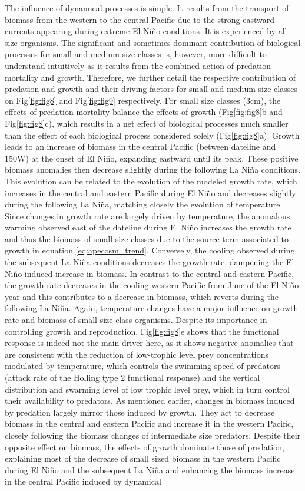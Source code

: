 The influence of dynamical processes is simple. It results from the transport of biomass from the western to the central Pacific due to the strong eastward currents appearing during extreme El Niño conditions. It is experienced by all size organisms. The significant and sometimes dominant contribution of biological processes for small and medium size classes is, however, more difficult to understand intuitively as it results from the combined action of predation mortality and growth. Therefore, we further detail the respective contribution of predation and growth and their driving factors for small and medium size classes on Fig\ref{fig:fig8} and Fig\ref{fig:fig9} respectively. For small size classes (3cm), the effects of predation mortality balance the effects of growth (Fig\ref{fig:fig8}b and Fig\ref{fig:fig8}c), which results in a net effect of biological processes much smaller than the effect of each biological process considered solely (Fig\ref{fig:fig8}a). Growth leads to an increase  of biomass in the central Pacific (between dateline and 150\degree{}W) at the onset of El Niño, expanding eastward until its peak. These positive biomass anomalies then decrease slightly during the following La Niña conditions. This evolution can be related to the evolution of the modeled growth rate, which increases in the central and eastern Pacific during El Niño and decreases slightly during the following La Niña, matching closely the evolution of temperature. Since changes in growth rate are largely driven by temperature, the anomalous warming observed east of the dateline during El Niño increases the growth rate and thus the biomass of small size classes due to the source term associated to growth in equation \ref{eq:apecosm_trend}. Conversely, the cooling observed during the subsequent La Niña conditions decreases the growth rate, dampening the El Niño-induced increase in biomass. In contrast to the central and eastern Pacific, the growth rate decreases in the cooling western Pacific from June of the El Niño year and this contributes to a decrease in biomass, which reverts during the following La Niña. Again, temperature changes have a major influence on growth rate and biomass of small size class organisms. Despite its importance in controlling growth and reproduction, Fig\ref{fig:fig8}e shows that the functional response is indeed not the main driver here, as it shows negative anomalies that are consistent with the reduction of low-trophic level prey concentrations modulated by temperature, which controls the swimming speed of predators (attack rate of the Holling type 2 functional response) and the vertical distribution and swarming level of low trophic level prey, which in turn control their availability to predators. As mentioned earlier, changes in biomass induced by predation largely mirror those induced by growth. They act to decrease biomass in the central and eastern Pacific and increase it in the western Pacific, closely following the biomass changes of intermediate size predators. Despite their opposite effect on biomass, the effects of growth dominate those of predation, explaining most of the decrease of small sized biomass in the western Pacific during El Niño and the subsequent La Niña and enhancing the biomass increase in the central Pacific induced by dynamical 